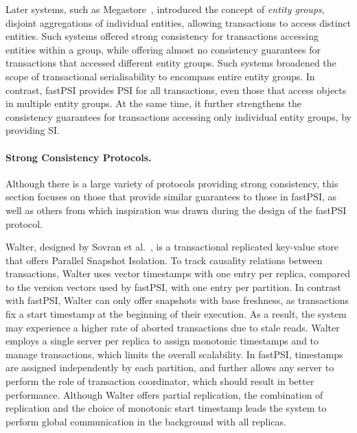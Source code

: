 Later systems, such as Megastore~\citep{baker_megastore}, introduced the concept of \emph{entity groups}, disjoint aggregations of individual entities, allowing transactions to access distinct entities. Such systems offered strong consistency for transactions accessing entities within a group, while offering almost no consistency guarantees for transactions that accessed different entity groups. Such systems broadened the scope of transactional serialisability to encompass entire entity groups. In contrast, fastPSI provides PSI for all transactions, even those that access objects in multiple entity groups. At the same time, it further strengthens the consistency guarantees for transactions accessing only individual entity groups, by providing SI.

\paragraph{Strong Consistency Protocols.} Although there is a large variety of protocols providing strong consistency, this section focuses on those that provide similar guarantees to those in fastPSI, as well as others from which inspiration was drawn during the design of the fastPSI protocol.


Walter, designed by Sovran et al.~\citep{psi-intro}, is a transactional replicated key-value store that offers Parallel Snapshot Isolation. To track causality relations between transactions, Walter uses vector timestamps with one entry per replica, compared to the version vectors used by fastPSI, with one entry per partition. In contrast with fastPSI, Walter can only offer snapshots with base freshness, as transactions fix a start timestamp at the beginning of their execution. As a result, the system may experience a higher rate of aborted transactions due to stale reads. Walter employs a single server per replica to assign monotonic timestamps and to manage transactions, which limits the overall scalability. In fastPSI, timestamps are assigned independently by each partition, and further allows any server to perform the role of transaction coordinator, which should result in better performance. Although Walter offers partial replication, the combination of replication and the choice of monotonic start timestamp leads the system to perform global communication in the background with all replicas.

